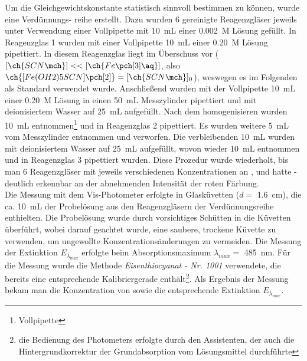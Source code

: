 \documentclass{article}
\begin{document}
      Um die Gleichgewichtskonstante statistisch sinnvoll bestimmen zu können, wurde eine Verdünnungs- reihe erstellt. Dazu wurden 6 gereinigte Reagenzgläser jeweils unter Verwendung einer Vollpipette mit \SI[mode=text]{10}{\milli\liter} einer \SI[mode=text]{0.002}{M}  Lösung gefüllt. In Reagenzglas 1 wurden mit einer Vollpipette \SI[mode=text]{10}{\milli\liter} einer \SI[mode=text]{0.20}{M}  Lösung pipettiert. In diesem Reagenzglas liegt  im Überschuss vor ($[\ch{SCN\mch}] << [\ch{Fe\pch[3]\aq}]$, also $\ch{[Fe(OH2)5SCN]\pch[2]} = [\ch{SCN\mch}]_{0}$), weswegen es im Folgenden als Standard verwendet wurde. Anschließend wurden mit der Vollpipette \SI[mode=text]{10}{\milli\liter} einer \SI[mode=text]{0.20}{M}  Lösung in einen \SI[mode=text]{50}{\milli\liter} Messzylinder pipettiert und mit deionisiertem Wasser auf \SI[mode=text]{25}{\milli\liter} aufgefüllt. Nach dem homogenisieren wurden \SI[mode=text]{10}{\milli\liter} entnommen\footnote{Vollpipette} und in Reagenzglas 2 pipettiert. Es wurden weitere \SI[mode=text]{5}{\milli\liter} vom Messzylinder entnommen und verworfen. Die verbleibenden \SI[mode=text]{10}{\milli\liter} wurden mit deionisiertem Wasser auf \SI[mode=text]{25}{\milli\liter} aufgefüllt, wovon wieder \SI[mode=text]{10}{\milli\liter} entnommen und in Reagenzglas 3 pipettiert wurden. Diese Prozedur wurde wiederholt, bis man 6 Reagenzgläser mit jeweils verschiedenen Konzentrationen an ,  und \ch{[Fe(OH2)5SCN]\pch[2]} hatte - deutlich erkennbar an der abnehmenden Intensität der roten Färbung. \\
      
      Die Messung mit dem Vis-Photometer erfolgte in Glasküvetten ($d =$ \SI[mode=text]{1.6}{\centi\meter}), die ca. \SI[mode=text]{10}{\milli\liter} der Probelösung aus den Reagenzgläsern der Verdünnungsreihe enthielten. Die Probelösung wurde durch vorsichtiges Schütten in die Küvetten überführt, wobei darauf geachtet wurde, eine saubere, trockene Küvette zu verwenden, um ungewollte Konzentrationsänderungen zu vermeiden. Die Messung der Extinktion $E_{\lambda _{max}}$ erfolgte beim Absorptionsmaximum $\lambda _{max} = $ \SI[mode=text]{485}{\nano\meter}. Für die Messung wurde die Methode \textit{Eisenthiocyanat - Nr. 1001} verwendete, die bereits eine entsprechende Kalibriergerade enthält\footnote{die Bedienung des Photometers erfolgte durch den Assistenten, der auch die Hintergrundkorrektur der Grundabsorption vom Lösungsmittel  durchführte}. Als Ergebnis der Messung bekam man die Konzentration von \ch{[Fe(OH2)5SCN]\pch[2]} sowie die entsprechende Extinktion $E_{\lambda _{max}}$. 
    
\end{document}
